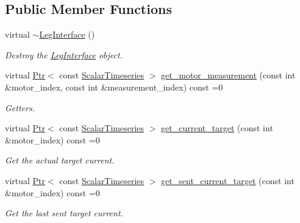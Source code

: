 \subsection*{Public Member Functions}
\begin{DoxyCompactItemize}
\item 
\mbox{\label{classblmc__drivers_1_1LegInterface_afe46102b0ce1c790e921d71f86868066}} 
virtual \hyperlink{classblmc__drivers_1_1LegInterface_afe46102b0ce1c790e921d71f86868066}{$\sim$\+Leg\+Interface} ()
\begin{DoxyCompactList}\small\item\em Destroy the \hyperlink{classblmc__drivers_1_1LegInterface}{Leg\+Interface} object. \end{DoxyCompactList}\item 
virtual \hyperlink{classblmc__drivers_1_1LegInterface_ac5af9e6514abff5ee918813925a8e42d}{Ptr}$<$ const \hyperlink{classblmc__drivers_1_1LegInterface_a57a35b64a76fb4225637828d1b1c35a6}{Scalar\+Timeseries} $>$ \hyperlink{classblmc__drivers_1_1LegInterface_ae653c7ee0ab7aa9d16a6bfce01580200}{get\+\_\+motor\+\_\+measurement} (const int \&motor\+\_\+index, const int \&measurement\+\_\+index) const =0
\begin{DoxyCompactList}\small\item\em Getters. \end{DoxyCompactList}\item 
virtual \hyperlink{classblmc__drivers_1_1LegInterface_ac5af9e6514abff5ee918813925a8e42d}{Ptr}$<$ const \hyperlink{classblmc__drivers_1_1LegInterface_a57a35b64a76fb4225637828d1b1c35a6}{Scalar\+Timeseries} $>$ \hyperlink{classblmc__drivers_1_1LegInterface_a44bac5c9a6015f0e08370b3bc9957512}{get\+\_\+current\+\_\+target} (const int \&motor\+\_\+index) const =0
\begin{DoxyCompactList}\small\item\em Get the actual target current. \end{DoxyCompactList}\item 
virtual \hyperlink{classblmc__drivers_1_1LegInterface_ac5af9e6514abff5ee918813925a8e42d}{Ptr}$<$ const \hyperlink{classblmc__drivers_1_1LegInterface_a57a35b64a76fb4225637828d1b1c35a6}{Scalar\+Timeseries} $>$ \hyperlink{classblmc__drivers_1_1LegInterface_ab724283c8eeadca0e7b8829de64f4f44}{get\+\_\+sent\+\_\+current\+\_\+target} (const int \&motor\+\_\+index) const =0
\begin{DoxyCompactList}\small\item\em Get the last sent target current. \end{DoxyCompactList}\item 

\end{DoxyCompactItemize}
